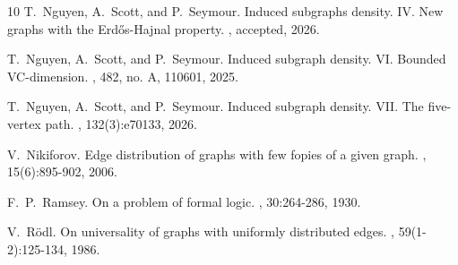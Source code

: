 \documentclass[a4paper,11pt]{article}
\begin{document}
\begin{thebibliography}{10}
T.~Nguyen, A.~Scott, and P.~Seymour.
\newblock Induced subgraphs density. IV. New graphs with the Erd\H{o}s-Hajnal property.
, accepted, 2026.


T.~Nguyen, A.~Scott, and P.~Seymour.
\newblock Induced subgraph density. VI. Bounded VC-dimension.
, 482, no. A, 110601, 2025.


T.~Nguyen, A.~Scott, and P.~Seymour.
\newblock Induced subgraph density. VII. The five-vertex path.
, 132(3):e70133, 2026.


V.~Nikiforov.
\newblock Edge distribution of graphs with few fopies of a given graph.
, 15(6):895-902, 2006.

F.~P.~Ramsey.
\newblock On a problem of formal logic.
, 30:264-286, 1930.

V.~R\"odl.
\newblock On universality of graphs with uniformly distributed edges.
, 59(1-2):125-134, 1986.


\end{thebibliography}
\end{document}

